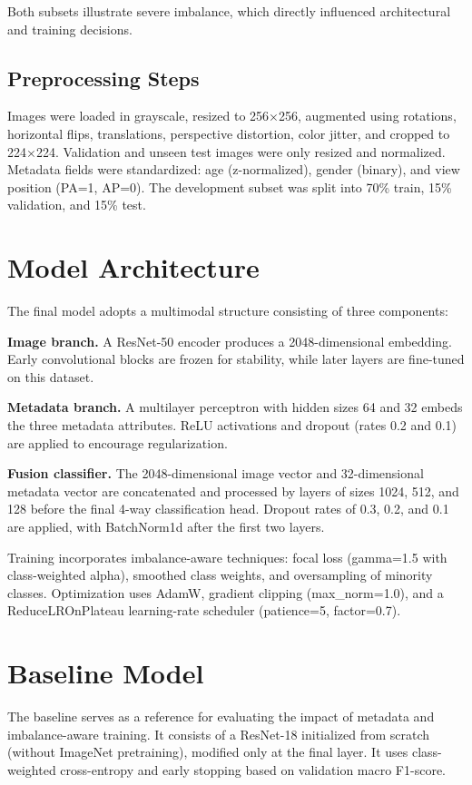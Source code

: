 \documentclass[final]{article}
\begin{document}
Both subsets illustrate severe imbalance, which directly influenced architectural and training decisions.

\subsection{Preprocessing Steps}
Images were loaded in grayscale, resized to 256×256, augmented using rotations, horizontal flips, translations, perspective distortion, color jitter, and cropped to 224×224. Validation and unseen test images were only resized and normalized. Metadata fields were standardized: age (z-normalized), gender (binary), and view position (PA=1, AP=0). The development subset was split into 70\% train, 15\% validation, and 15\% test.

\section{Model Architecture}
The final model adopts a multimodal structure consisting of three components:

\textbf{Image branch.} A ResNet-50 encoder produces a 2048-dimensional embedding. Early convolutional blocks are frozen for stability, while later layers are fine-tuned on this dataset.

\textbf{Metadata branch.} A multilayer perceptron with hidden sizes 64 and 32 embeds the three metadata attributes. ReLU activations and dropout (rates 0.2 and 0.1) are applied to encourage regularization.

\textbf{Fusion classifier.} The 2048-dimensional image vector and 32-dimensional metadata vector are concatenated and processed by layers of sizes 1024, 512, and 128 before the final 4-way classification head. Dropout rates of 0.3, 0.2, and 0.1 are applied, with BatchNorm1d after the first two layers.

Training incorporates imbalance-aware techniques: focal loss (gamma=1.5 with class-weighted alpha), smoothed class weights, and oversampling of minority classes. Optimization uses AdamW, gradient clipping (max\_norm=1.0), and a ReduceLROnPlateau learning-rate scheduler (patience=5, factor=0.7).

\section{Baseline Model}
The baseline serves as a reference for evaluating the impact of metadata and imbalance-aware training. It consists of a ResNet-18 initialized from scratch (without ImageNet pretraining), modified only at the final layer. It uses class-weighted cross-entropy and early stopping based on validation macro F1-score.  
\end{document}
